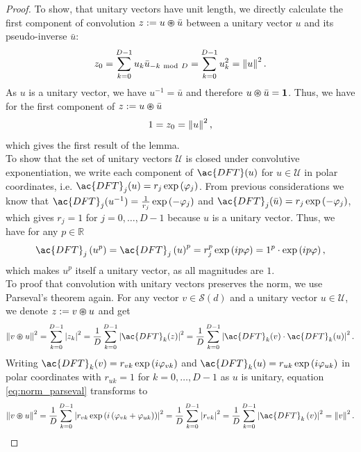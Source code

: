 \begin{proof}
	To show, that unitary vectors have unit length, we directly calculate the first component of convolution $z :=u \varoast \bar{u}$ between a unitary vector $u$ and its pseudo-inverse $\bar{u}$:
	\[
	z_{0} = \sum_{k=0}^{D-1} u_{k} \bar{u}_{-k \ \mathrm{mod}\ D} = \sum_{k=0}^{D-1} u_{k}^{2} = \left\| u \right\|^{2}.
	\]
	As $u$ is a unitary vector, we have $u^{-1} = \bar{u}$ and therefore $u\varoast \bar{u} = \mathbf{1}$.
	Thus, we have for the first component of $z :=u \varoast \bar{u}$
	\[
	1 = z_{0} = \left\| u \right\|^{2},
	\]
	which gives the first result of the lemma.\\
	To show that the set of unitary vectors $\mathcal{U}$ is closed under convolutive exponentiation, we write each component of $\ac{DFT}(u)$ for $u \in \mathcal{U}$ in polar coordinates, i.e. $\ac{DFT}_j(u) = r_j\exp\left(\varphi_j\right)$.
	From previous considerations we know that $\ac{DFT}_j(u^{-1}) = \frac{1}{r_j}\exp\left(-\varphi_j\right)$ and $\ac{DFT}_j(\bar{u}) = r_j\exp\left(-\varphi_j\right)$, which gives $r_j=1$ for $j=0, \ldots, D-1$ because $u$ is a unitary vector.
	Thus, we have for any $p \in \mathbb{R}$
	\[
	\ac{DFT}_j\left(u^{p}\right) = \ac{DFT}_j\left(u\right)^{p} = r_j^{p}\exp\left(ip\varphi\right) = 1^{p} \cdot \exp\left(ip\varphi\right),
	\]
	which makes $u^{p}$ itself a unitary vector, as all magnitudes are $1$.	\\
	To proof that convolution with unitary vectors preserves the norm, we use Parseval's theorem again. 
	For any vector $v \in \mathcal{S}(d)$ and  a unitary vector $u \in \mathcal{U}$, we denote $z:= v \varoast u$ and get 
	\begin{equation}
	\label{eq:norm_parseval}
	\norm{v \varoast u}^{2} = \sum_{k=0}^{D-1} \left|z_{k}\right|^{2} = \frac{1}{D} \sum_{k=0}^{D-1} \left|\ac{DFT}_{k}(z)\right|^{2} = \frac{1}{D} \sum_{k=0}^{D-1} \left|\ac{DFT}_{k}(v) \cdot \ac{DFT}_{k}(u)\right|^{2}.
	\end{equation}
	Writing $\ac{DFT}_{k}(v) = r_{vk}\exp\left(i\varphi_{vk}\right)$ and $\ac{DFT}_{k}(u) = r_{uk}\exp\left(i\varphi_{uk}\right)$ in polar coordinates with $r_{uk} = 1$ for $k=0, \ldots, D-1$ as $u$ is unitary, equation \ref{eq:norm_parseval} transforms to
	\begin{equation*}
	\norm{v \varoast u}^{2} = \frac{1}{D} \sum_{k=0}^{D-1} \left|r_{vk} \exp\left(i\left(\varphi_{vk} + \varphi_{uk}\right)\right)\right|^{2} = \frac{1}{D} \sum_{k=0}^{D-1} \left|r_{vk}\right|^{2} = \frac{1}{D} \sum_{k=0}^{D-1} \left|\ac{DFT}_k\left(v\right)\right|^{2} = \norm{v}^{2}.
	\end{equation*}
\end{proof}

